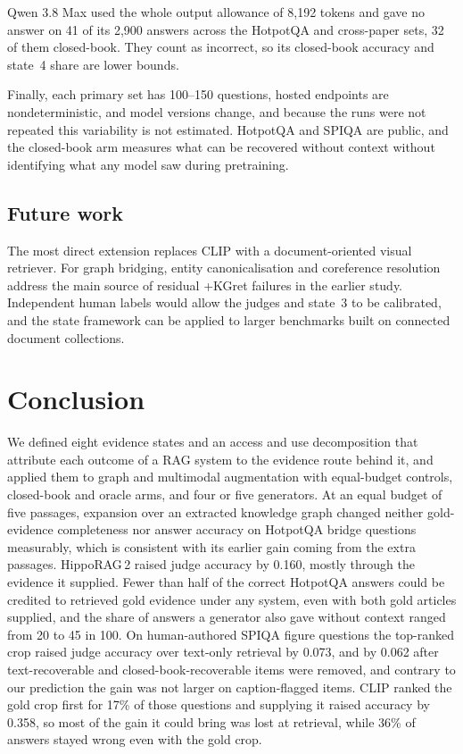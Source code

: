 \documentclass[preprint,12pt]{elsarticle}
\begin{document}
Qwen 3.8 Max used the whole output allowance of 8{,}192 tokens and gave no
answer on 41 of its 2{,}900 answers across the HotpotQA and cross-paper sets,
32 of them closed-book. They count as incorrect, so its closed-book accuracy
and state~4 share are lower bounds.

Finally, each primary set has 100--150 questions, hosted endpoints are
nondeterministic, and model versions change, and because the runs were not
repeated this variability is not estimated. HotpotQA and SPIQA are public, and the
closed-book arm measures what can be recovered without context without
identifying what any model saw during pretraining.

\subsection{Future work}

The most direct extension replaces CLIP with a document-oriented visual
retriever. For graph bridging, entity canonicalisation and coreference
resolution address the main source of residual +KGret failures in the earlier
study. Independent human labels would allow the judges and state~3 to be
calibrated, and the state framework can be applied to larger benchmarks built
on connected document collections.

\section{Conclusion}
\label{sec:conclusion}

We defined eight evidence states and an access and use decomposition that
attribute each outcome of a RAG system to the evidence route behind it, and
applied them to graph and multimodal augmentation with equal-budget controls,
closed-book and oracle arms, and four or five generators. At an equal budget of five
passages, expansion over an extracted knowledge graph changed neither
gold-evidence completeness nor answer accuracy on HotpotQA bridge questions
measurably, which is consistent with its earlier gain coming from the extra
passages. HippoRAG\,2 raised judge accuracy by 0.160, mostly through the
evidence it supplied. Fewer than half of the correct HotpotQA answers could be
credited to retrieved gold evidence under any system, even with both gold
articles supplied, and the share of answers a generator also gave without
context ranged from 20 to 45 in 100. On human-authored SPIQA figure questions the
top-ranked crop raised judge accuracy over text-only retrieval by 0.073, and by
0.062 after text-recoverable and closed-book-recoverable items were removed, and
contrary to our prediction the gain was not larger on caption-flagged items. CLIP
ranked the gold crop first for 17\% of those questions and supplying it raised
accuracy by 0.358, so most of the gain it could bring was lost at retrieval, while
36\% of answers stayed wrong even with the gold crop.
\end{document}
